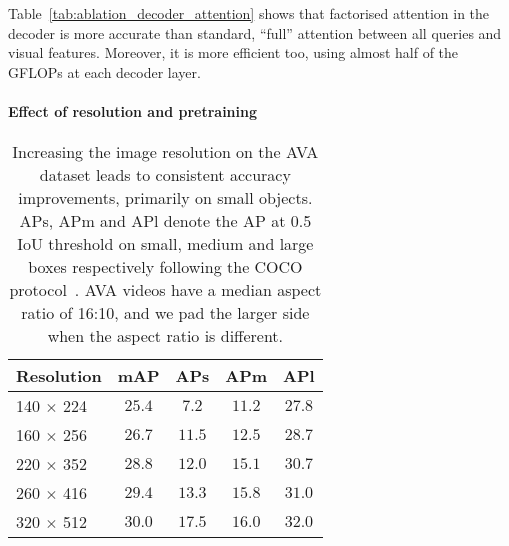 \documentclass[10pt,twocolumn,letterpaper]{article}
\def \paravspace {-0.7\baselineskip}
\begin{document}
Table~\ref{tab:ablation_decoder_attention} shows that factorised attention in the decoder is more accurate than standard, ``full'' attention between all queries and visual features.
Moreover, it is more efficient too, using almost half of the GFLOPs at each decoder layer.

\vspace{\paravspace}
\paragraph{Effect of resolution and pretraining}


\begin{table}[t]
    \centering
    \caption{
    Increasing the image resolution on the AVA dataset leads to consistent accuracy improvements, primarily on small objects.
    APs, APm and APl denote the AP at 0.5 IoU threshold on small, medium and large boxes respectively following the COCO protocol~\cite{lin_coco_eccv_2014}.
    AVA videos have a median aspect ratio of 16:10, and we pad the larger side when the aspect ratio is different.
    }
    \begin{tabular}{lcccc}
    \toprule
    Resolution                 & mAP  & APs & APm & APl \\  \midrule
    140 $\times$ 224           &  $25.4$ & $7.2$ & $11.2$  & $27.8$ \\
    160 $\times$ 256           &  $26.7$ & $11.5$ & $12.5$ & $28.7$ \\ 220 $\times$ 352           &  $28.8$ & $12.0$ & $15.1$ & $30.7$ \\
    260 $\times$ 416           &  $29.4$ & $13.3$ & $15.8$ & $31.0$ \\
    320 $\times$ 512           &  $30.0$ & $17.5$ & $16.0$ & $32.0$ \\  \bottomrule
    \end{tabular}
    \label{tab:ablation_resolution}
    \vspace{-0.5\baselineskip}
\end{table}
\end{document}
